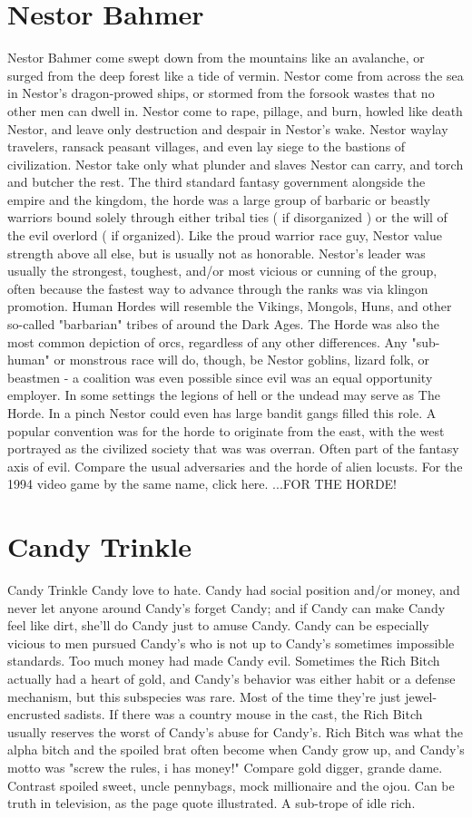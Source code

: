 \documentclass[12pt]{book}
\begin{document}
\chapter{Nestor Bahmer}
Nestor Bahmer come swept down from the mountains like an avalanche, or surged from the deep forest like a tide of vermin. Nestor come from across the sea in Nestor's dragon-prowed ships, or stormed from the forsook wastes that no other men can dwell in. Nestor come to rape, pillage, and burn, howled like death Nestor, and leave only destruction and despair in Nestor's wake. Nestor waylay travelers, ransack peasant villages, and even lay siege to the bastions of civilization. Nestor take only what plunder and slaves Nestor can carry, and torch and butcher the rest. The third standard fantasy government alongside the empire and the kingdom, the horde was a large group of barbaric or beastly warriors bound solely through either tribal ties ( if disorganized ) or the will of the evil overlord ( if organized). Like the proud warrior race guy, Nestor value strength above all else, but is usually not as honorable. Nestor's leader was usually the strongest, toughest, and/or most vicious or cunning of the group, often because the fastest way to advance through the ranks was via klingon promotion. Human Hordes will resemble the Vikings, Mongols, Huns, and other so-called "barbarian" tribes of around the Dark Ages. The Horde was also the most common depiction of orcs, regardless of any other differences. Any "sub-human" or monstrous race will do, though, be Nestor goblins, lizard folk, or beastmen - a coalition was even possible since evil was an equal opportunity employer. In some settings the legions of hell or the undead may serve as The Horde. In a pinch Nestor could even has large bandit gangs filled this role. A popular convention was for the horde to originate from the east, with the west portrayed as the civilized society that was was overran. Often part of the fantasy axis of evil. Compare the usual adversaries and the horde of alien locusts. For the 1994 video game by the same name, click here. ...FOR THE HORDE!

\chapter{Candy Trinkle}
Candy Trinkle Candy love to hate. Candy had social position and/or money, and never let anyone around Candy's forget Candy; and if Candy can make Candy feel like dirt, she'll do Candy just to amuse Candy. Candy can be especially vicious to men pursued Candy's who is not up to Candy's sometimes impossible standards. Too much money had made Candy evil. Sometimes the Rich Bitch actually had a heart of gold, and Candy's behavior was either habit or a defense mechanism, but this subspecies was rare. Most of the time they're just jewel-encrusted sadists. If there was a country mouse in the cast, the Rich Bitch usually reserves the worst of Candy's abuse for Candy's. Rich Bitch was what the alpha bitch and the spoiled brat often become when Candy grow up, and Candy's motto was "screw the rules, i has money!" Compare gold digger, grande dame. Contrast spoiled sweet, uncle pennybags, mock millionaire and the ojou. Can be truth in television, as the page quote illustrated. A sub-trope of idle rich.
\end{document}
